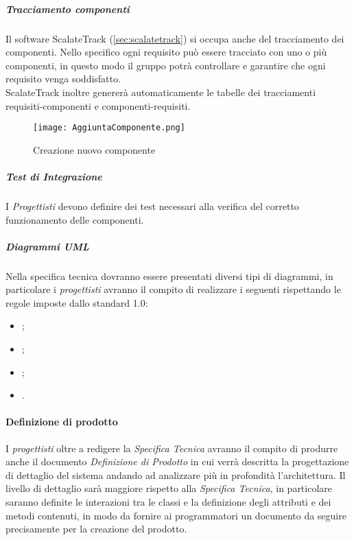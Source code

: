 \documentclass{scalatekids-article}
\begin{document}
\subparagraph{Tracciamento componenti}

Il software ScalateTrack (\ref{sec:scalatetrack}) si occupa anche del
tracciamento dei componenti. Nello specifico ogni requisito può essere tracciato
con uno o più componenti, in questo modo il gruppo potrà controllare e garantire
che ogni requisito venga soddisfatto.\\ ScalateTrack inoltre genererà
automaticamente le tabelle dei tracciamenti requisiti-componenti e
componenti-requisiti.

\begin{figure}[H]
  \centering
  \texttt{[image: AggiuntaComponente.png]}
  \caption{Creazione nuovo componente}
\end{figure}

\subparagraph{Test di Integrazione}

I \textit{Progettisti} devono definire dei test necessari alla verifica del
corretto funzionamento delle componenti.

\subparagraph{Diagrammi UML}
\label{sec:diagrammiUmlSpecTec}
Nella specifica tecnica dovranno essere presentati diversi tipi di diagrammi, in
particolare i \textit{progettisti} avranno il compito di realizzare i seguenti
rispettando le regole imposte dallo standard 
1.0:
\begin{itemize}
\item {};
\item {};
\item {};
\item {}.
\end{itemize}

\paragraph{Definizione di prodotto}
I \textit{progettisti} oltre a redigere la \textit{Specifica Tecnica} avranno il
compito di produrre anche il documento \textit{Definizione di Prodotto} in cui
verrà descritta la progettazione di dettaglio del sistema andando ad analizzare
più in profondità l'architettura. Il livello di dettaglio sarà maggiore rispetto
alla \textit{Specifica Tecnica}, in particolare saranno definite le interazioni
tra le classi e la definizione degli attributi e dei metodi contenuti, in modo
da fornire ai programmatori un documento da seguire precisamente per la
creazione del prodotto.
\end{document}
